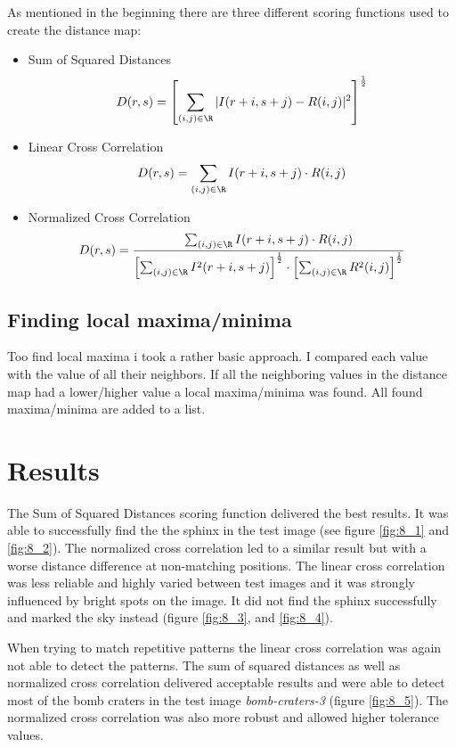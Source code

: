 As mentioned in the beginning there are three different scoring functions used to create the distance map:
\begin{itemize}
	\item Sum of Squared Distances
	\begin{equation}
		D(r,s) = \left[ \sum_{(i,j) \in \R} \vert I(r+i,s + j) - R(i,j)\vert^2\right]^{\frac{1}{2}}
	\end{equation}
	\item Linear Cross Correlation
	\begin{equation}
		D(r,s) = \sum_{(i,j) \in \R} I(r+i,s + j) \cdot R(i,j)
	\end{equation}
	\item Normalized Cross Correlation
	\begin{equation}
		D(r,s) = \frac{\sum_{(i,j) \in \R} I(r + i,s +j) \cdot R(i,j)}{\left[\sum_{(i,j) \in \R} I^2(r+i,s+j)\right]^{\frac{1}{2}} \cdot \left[\sum_{(i,j) \in \R} R^2(i,j)\right]^{\frac{1}{2}}}
	\end{equation}
\end{itemize}

\subsection{Finding local maxima/minima}
Too find local maxima i took a rather basic approach. I compared each value with the value of all their neighbors. If all the neighboring values in the distance map had a lower/higher value a local maxima/minima was found. All found maxima/minima are added to a list.

\section{Results}
The Sum of Squared Distances scoring function delivered the best results. It was able to successfully find the the sphinx in the test image (see figure \ref{fig:8_1} and \ref{fig:8_2}). The normalized cross correlation led to a similar result but with a worse distance difference at non-matching positions. The linear cross correlation was less reliable and highly varied between test images and it was strongly influenced by bright spots on the image. It did not find the sphinx successfully and marked the sky instead (figure \ref{fig:8_3}, and \ref{fig:8_4}).

When trying to match repetitive patterns the linear cross correlation was again not able to detect the patterns. The sum of squared distances as well as normalized cross correlation delivered acceptable results and were able to detect most of the bomb craters in the test image \textit{bomb-craters-3} (figure \ref{fig:8_5}). The normalized cross correlation was also more robust and allowed higher tolerance values.

